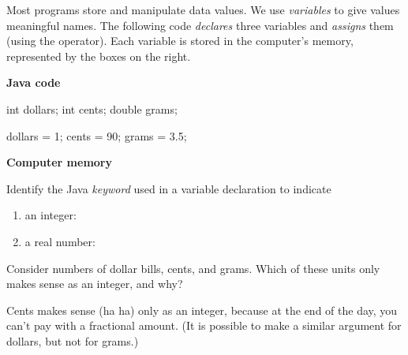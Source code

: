 
Most programs store and manipulate data values.
We use \emph{variables} to give values meaningful names.
The following code \emph{declares} three variables and \emph{assigns} them (using the \java{=} operator).
Each variable is stored in the computer's memory, represented by the boxes on the right.

\vspace{1em}
\hfill
\begin{minipage}[t]{0.5\textwidth}

\textbf{Java code}
\vspace{1ex}

\begin{javalst}
int dollars;
int cents;
double grams;

dollars = 1;
cents = 90;
grams = 3.5;
\end{javalst}

\end{minipage}
\hfill
\begin{minipage}[t]{0.4\textwidth}

\textbf{Computer memory}
\vspace{1em}

\par\vspace{1em}
\par\vspace{1em}

\end{minipage}




\Q Identify the Java \emph{keyword} used in a variable declaration to indicate

\begin{enumerate}
\item an integer: 
\item a real number: 
\end{enumerate}


\Q Consider numbers of dollar bills, cents, and grams.
Which of these units only makes sense as an integer, and why?

\begin{answer}
Cents makes sense (ha ha) only as an integer, because at the end of the day, you can't pay with a fractional amount. (It is possible to make a similar argument for dollars, but not for grams.)
\end{answer}


